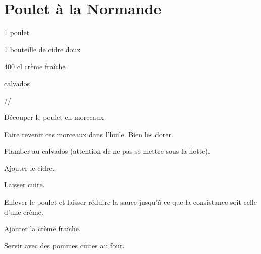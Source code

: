 \section[\normalsize{Poulet à la Normande}]{Poulet à la Normande}

\begin{ingredients}
\item 1 poulet 
\item 1 bouteille de cidre doux
\item	400 cl crème fraîche
\item	calvados
\end{ingredients}
\begin{infos}
//~
\end{infos}
\begin{etapes}
\item D\'ecouper le poulet en morceaux.
\item Faire revenir ces morceaux dans l’huile.
Bien les dorer.
\item Flamber au calvados (attention de ne pas se mettre sous la hotte).
\item Ajouter le cidre.
\item Laisser cuire.
\item Enlever le poulet et laisser r\'eduire la sauce jusqu’\`a ce que la consistance soit celle d’une cr\`eme.
\item Ajouter la cr\`eme fra\^iche.
\item Servir avec des pommes cuites au four. 
\end{etapes}
\begin{conseils}
\end{conseils}